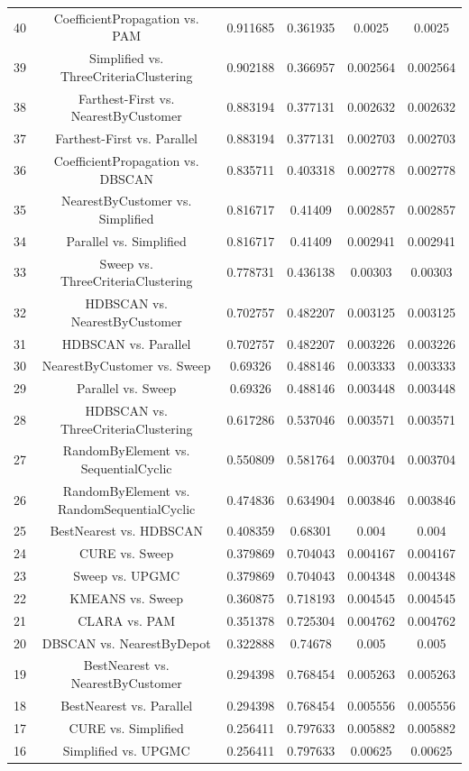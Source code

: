 \documentclass[a4paper,10pt]{article}
\begin{document}
\begin{landscape}
\begin{table}[!htp]
\begin{tabular}{cccccc}
40&CoefficientPropagation vs. PAM&0.911685&0.361935&0.0025&0.0025\\
39&Simplified vs. ThreeCriteriaClustering&0.902188&0.366957&0.002564&0.002564\\
38&Farthest-First vs. NearestByCustomer&0.883194&0.377131&0.002632&0.002632\\
37&Farthest-First vs. Parallel&0.883194&0.377131&0.002703&0.002703\\
36&CoefficientPropagation vs. DBSCAN&0.835711&0.403318&0.002778&0.002778\\
35&NearestByCustomer vs. Simplified&0.816717&0.41409&0.002857&0.002857\\
34&Parallel vs. Simplified&0.816717&0.41409&0.002941&0.002941\\
33&Sweep vs. ThreeCriteriaClustering&0.778731&0.436138&0.00303&0.00303\\
32&HDBSCAN vs. NearestByCustomer&0.702757&0.482207&0.003125&0.003125\\
31&HDBSCAN vs. Parallel&0.702757&0.482207&0.003226&0.003226\\
30&NearestByCustomer vs. Sweep&0.69326&0.488146&0.003333&0.003333\\
29&Parallel vs. Sweep&0.69326&0.488146&0.003448&0.003448\\
28&HDBSCAN vs. ThreeCriteriaClustering&0.617286&0.537046&0.003571&0.003571\\
27&RandomByElement vs. SequentialCyclic&0.550809&0.581764&0.003704&0.003704\\
26&RandomByElement vs. RandomSequentialCyclic&0.474836&0.634904&0.003846&0.003846\\
25&BestNearest vs. HDBSCAN&0.408359&0.68301&0.004&0.004\\
24&CURE vs. Sweep&0.379869&0.704043&0.004167&0.004167\\
23&Sweep vs. UPGMC&0.379869&0.704043&0.004348&0.004348\\
22&KMEANS vs. Sweep&0.360875&0.718193&0.004545&0.004545\\
21&CLARA vs. PAM&0.351378&0.725304&0.004762&0.004762\\
20&DBSCAN vs. NearestByDepot&0.322888&0.74678&0.005&0.005\\
19&BestNearest vs. NearestByCustomer&0.294398&0.768454&0.005263&0.005263\\
18&BestNearest vs. Parallel&0.294398&0.768454&0.005556&0.005556\\
17&CURE vs. Simplified&0.256411&0.797633&0.005882&0.005882\\
16&Simplified vs. UPGMC&0.256411&0.797633&0.00625&0.00625\\

\end{tabular}
\end{table}
\end{landscape}
\end{document}
